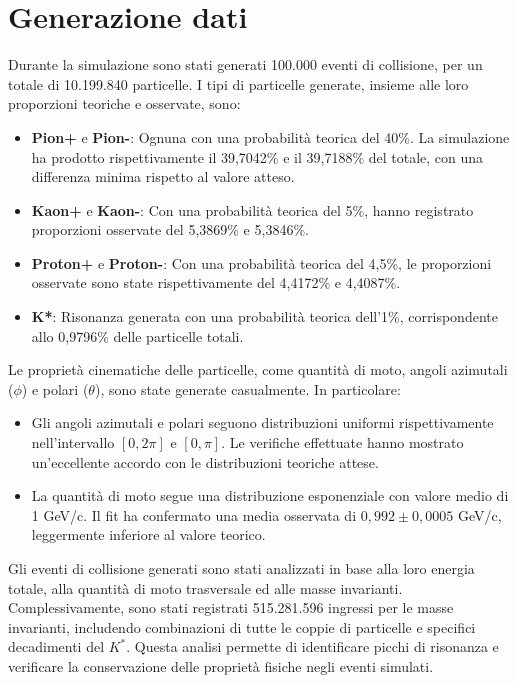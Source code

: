 \documentclass[a4paper,11pt]{article}
\begin{document}
\clearpage

\section{Generazione dati}

Durante la simulazione sono stati generati 100.000 eventi di collisione, per un totale di 10.199.840 particelle. I tipi di particelle generate, insieme alle loro proporzioni teoriche e osservate, sono:

\begin{itemize}
    \item \textbf{Pion+} e \textbf{Pion-}: Ognuna con una probabilità teorica del 40\%. La simulazione ha prodotto rispettivamente il 39,7042\% e il 39,7188\% del totale, con una differenza minima rispetto al valore atteso.
    \item \textbf{Kaon+} e \textbf{Kaon-}: Con una probabilità teorica del 5\%, hanno registrato proporzioni osservate del 5,3869\% e 5,3846\%.
    \item \textbf{Proton+} e \textbf{Proton-}: Con una probabilità teorica del 4,5\%, le proporzioni osservate sono state rispettivamente del 4,4172\% e 4,4087\%.
    \item \textbf{K*}: Risonanza generata con una probabilità teorica dell'1\%, corrispondente allo 0,9796\% delle particelle totali.
\end{itemize}

Le proprietà cinematiche delle particelle, come quantità di moto, angoli azimutali (\( \phi \)) e polari (\( \theta \)), sono state generate casualmente. In particolare:

\begin{itemize}
    \item Gli angoli azimutali e polari seguono distribuzioni uniformi rispettivamente nell'intervallo \([0, 2\pi]\) e \([0, \pi]\). Le verifiche effettuate hanno mostrato un'eccellente accordo con le distribuzioni teoriche attese.
    \item La quantità di moto segue una distribuzione esponenziale con valore medio di 1 GeV/c. Il fit ha confermato una media osservata di \(0,992 \pm 0,0005\) GeV/c, leggermente inferiore al valore teorico.
\end{itemize}

Gli eventi di collisione generati sono stati analizzati in base alla loro energia totale, alla quantità di moto trasversale ed alle masse invarianti. Complessivamente, sono stati registrati 515.281.596 ingressi per le masse invarianti, includendo combinazioni di tutte le coppie di particelle e specifici decadimenti del \( K^* \). Questa analisi permette di identificare picchi di risonanza e verificare la conservazione delle proprietà fisiche negli eventi simulati.
\end{document}
